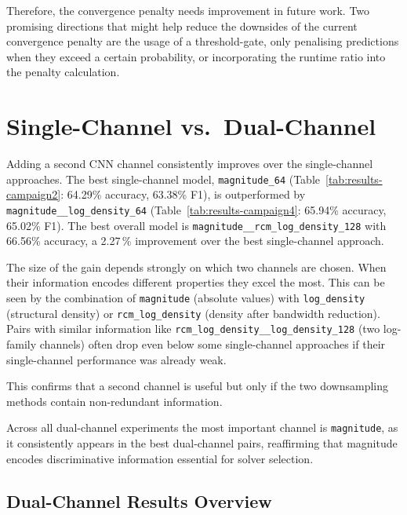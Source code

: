 Therefore, the convergence penalty needs improvement in future work.
Two promising directions that might help reduce the downsides of the current convergence penalty are the usage of
a threshold-gate, only penalising predictions when they exceed a certain probability, or incorporating the runtime ratio into
the penalty calculation.

\section{Single-Channel vs.\ Dual-Channel}\label{sec:results-single-vs-dual}

Adding a second CNN channel consistently improves over the single-channel approaches.
The best single-channel model, \texttt{magnitude\_64} (Table~\ref{tab:results-campaign2}: 64.29\% accuracy, 63.38\% F1), is outperformed by
\texttt{magnitude\_\_log\_density\_64} (Table~\ref{tab:results-campaign4}: 65.94\% accuracy, 65.02\% F1).
The best overall model is \texttt{magnitude\_\_rcm\_log\_density\_128} with 66.56\% accuracy, a 2.27\,\% improvement
over the best single-channel approach.

The size of the gain depends strongly on which two channels are chosen. When their information encodes different properties
they excel the most.
This can be seen by the combination of \texttt{magnitude} (absolute values) with \texttt{log\_density} (structural density) or \texttt{rcm\_log\_density} (density after bandwidth reduction).
Pairs with similar information like \texttt{rcm\_log\_density\_\_log\_density\_128} (two log-family channels) often drop even below some single-channel approaches
if their single-channel performance was already weak.

This confirms that a second channel is useful but only if the two downsampling methods contain non-redundant information.

Across all dual-channel experiments the most important channel is \texttt{magnitude}, as it consistently appears in the best
dual-channel pairs, reaffirming that magnitude encodes discriminative information essential for solver selection.


\subsection{Dual-Channel Results Overview}\label{subsec:dual-chan-results}

